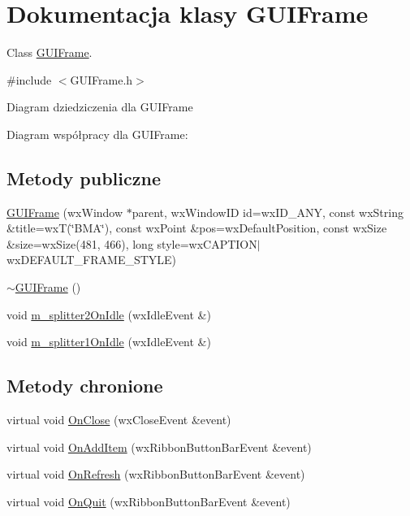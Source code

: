 \hypertarget{class_g_u_i_frame}{\section{Dokumentacja klasy G\+U\+I\+Frame}
\label{class_g_u_i_frame}
}


Class \hyperlink{class_g_u_i_frame}{G\+U\+I\+Frame}.  




{\ttfamily \#include $<$G\+U\+I\+Frame.\+h$>$}



Diagram dziedziczenia dla G\+U\+I\+Frame


Diagram współpracy dla G\+U\+I\+Frame\+:
\subsection*{Metody publiczne}
\begin{DoxyCompactItemize}
\item 
\hyperlink{class_g_u_i_frame_a99041f1f29bd297f167fecd6ea961138}{G\+U\+I\+Frame} (wx\+Window $\ast$parent, wx\+Window\+I\+D id=wx\+I\+D\+\_\+\+A\+N\+Y, const wx\+String \&title=wx\+T(\char`\"{}B\+M\+A\char`\"{}), const wx\+Point \&pos=wx\+Default\+Position, const wx\+Size \&size=wx\+Size(481, 466), long style=wx\+C\+A\+P\+T\+I\+O\+N$\vert$wx\+D\+E\+F\+A\+U\+L\+T\+\_\+\+F\+R\+A\+M\+E\+\_\+\+S\+T\+Y\+L\+E)
\item 
\hyperlink{class_g_u_i_frame_a1e078f7765a8aa753101fd4e0cc0e0b0}{$\sim$\+G\+U\+I\+Frame} ()
\item 
void \hyperlink{class_g_u_i_frame_ad175028388eacf06fac046f5bb6a8c2e}{m\+\_\+splitter2\+On\+Idle} (wx\+Idle\+Event \&)
\item 
void \hyperlink{class_g_u_i_frame_acd4f81331a4805ec3fe95d9ab9c6caa1}{m\+\_\+splitter1\+On\+Idle} (wx\+Idle\+Event \&)
\end{DoxyCompactItemize}
\subsection*{Metody chronione}
\begin{DoxyCompactItemize}
\item 
virtual void \hyperlink{class_g_u_i_frame_a6b99e20a320f07b2551dd0797d798e40}{On\+Close} (wx\+Close\+Event \&event)
\item 
virtual void \hyperlink{class_g_u_i_frame_a61c2049883d2bd8dbe7ee4bbf23a7210}{On\+Add\+Item} (wx\+Ribbon\+Button\+Bar\+Event \&event)
\item 
virtual void \hyperlink{class_g_u_i_frame_a7d9938c3ae00b4e8d1367b94b24ea326}{On\+Refresh} (wx\+Ribbon\+Button\+Bar\+Event \&event)
\item 
virtual void \hyperlink{class_g_u_i_frame_ab0ffdd17fab85e47117dcb0a19a2eb6d}{On\+Quit} (wx\+Ribbon\+Button\+Bar\+Event \&event)
\end{DoxyCompactItemize}

